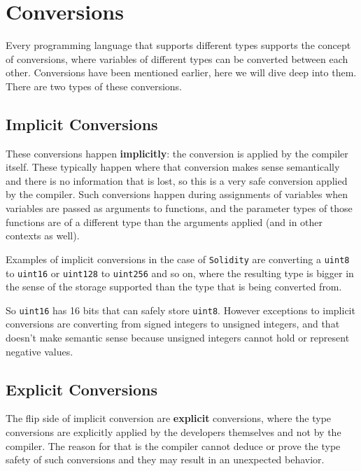 \section{Conversions}\label{conversions}

Every programming language that supports different types supports the
concept of conversions, where variables of different types can be
converted between each other. Conversions have been mentioned earlier,
here we will dive deep into them. There are two types of these
conversions.

\subsection{Implicit Conversions}\label{implicit-conversions}

These conversions happen \textbf{implicitly}: the conversion is applied
by the compiler itself. These typically happen where that conversion
makes sense semantically and there is no information that is lost, so
this is a very safe conversion applied by the compiler. Such conversions
happen during assignments of variables when variables are passed as
arguments to functions, and the parameter types of those functions are
of a different type than the arguments applied (and in other contexts as
well).

Examples of implicit conversions in the case of \texttt{Solidity} are
converting a \texttt{uint8} to \texttt{uint16} or \texttt{uint128} to
\texttt{uint256} and so on, where the resulting type is bigger in the
sense of the storage supported than the type that is being converted
from.

So \texttt{uint16} has 16 bits that can safely store \texttt{uint8}.
However exceptions to implicit conversions are converting from signed
integers to unsigned integers, and that doesn't make semantic sense
because unsigned integers cannot hold or represent negative values.

\subsection{Explicit Conversions}\label{explicit-conversions}

The flip side of implicit conversion are \textbf{explicit} conversions,
where the type conversions are explicitly applied by the developers
themselves and not by the compiler. The reason for that is the compiler
cannot deduce or prove the type safety of such conversions and they may
result in an unexpected behavior.


